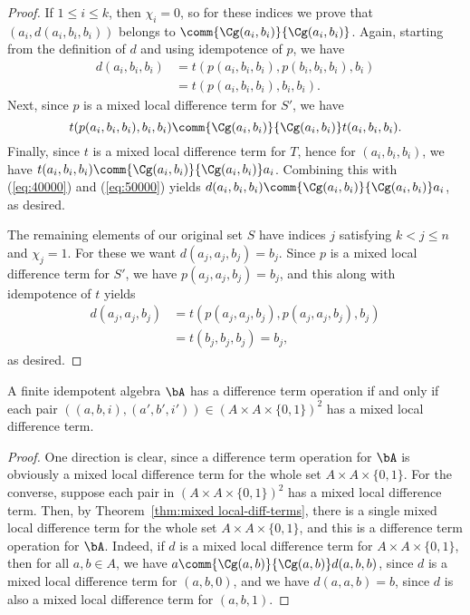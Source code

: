 \begin{proof}
If $1\leq i \leq k$, then $\chi_i =0$, so for these indices we prove
that $(a_i, d(a_i,b_i,b_i))$ belongs to $\comm{\Cg(a_i,b_i)}{\Cg(a_i,b_i)}$.
Again, starting from the definition of $d$ and using idempotence of $p$, we have
\begin{align}
  d(a_i,b_i,b_i) &=
  t(p(a_i,b_i,b_i), p(b_i,b_i,b_i), b_i)   \label{eq:40000}\\
  &=t(p(a_i,b_i,b_i), b_i, b_i). \nonumber
\end{align}
Next, since $p$ is a mixed local difference term for $S'$, we have
\begin{equation}
  \label{eq:50000}
  t(p(a_i,b_i,b_i), b_i, b_i)
 \comm{\Cg(a_i,b_i)}{\Cg(a_i,b_i)}
 t(a_i, b_i, b_i).
\end{equation}
Finally, since $t$ is a mixed local difference term for $T$, hence for
$(a_i, b_i, b_i)$,  %
we have 
$t(a_i, b_i, b_i) \comm{\Cg(a_i,b_i)}{\Cg(a_i,b_i)} a_i$.
Combining this with (\ref{eq:40000}) and (\ref{eq:50000}) yields
$d(a_i,b_i,b_i) \comm{\Cg(a_i,b_i)}{\Cg(a_i,b_i)} a_i$,
as desired.

The remaining elements of our original set $S$
have indices $j$ satisfying $k<j\leq n$ and $\chi_j = 1$.
For these we want $d(a_j,a_j,b_j) = b_j$.
Since $p$ is a mixed local difference term for $S'$, we have
$p(a_j,a_j,b_j) = b_j$, and this along with idempotence of $t$ yields
\begin{align*}
d(a_j,a_j,b_j) &=
t(p(a_j,a_j,b_j), p(a_j,a_j,b_j), b_j)\\
&=t(b_j, b_j, b_j) =b_j,
\end{align*}
as desired.
\end{proof}

\begin{cor}
  \label{cor:loc-diff-term}
  A finite idempotent algebra $\bA$ has a difference term operation if and
  only if each pair $((a,b,i), (a',b',i')) \in (A\times A \times \{0,1\})^2$ has a mixed local
  difference term.
\end{cor}
\begin{proof}
  One direction is clear, since a difference term operation for $\bA$ is
  obviously a mixed local difference term for the whole set 
  $A\times A \times \{0,1\}$.
  For the converse, suppose
  each pair in $(A\times A \times \{0,1\})^2$ has a mixed local
  difference term. Then, by Theorem~\ref{thm:mixed local-diff-terms},
  there is a single mixed local difference term for the whole set $A\times A \times \{0,1\}$,
  and this is a difference term operation for $\bA$.  Indeed, if $d$ is a
  mixed local difference term for $A\times A \times \{0,1\}$, then 
  for all $a, b \in A$, we have
  $a \comm{\Cg(a,b)}{\Cg(a,b)} d(a,b,b)$,
  since $d$ is a mixed local difference term for $(a,b,0)$, and we have
  $d(a,a,b) = b$, since $d$ is also a mixed local difference term for
  $(a,b,1)$.
\end{proof}

